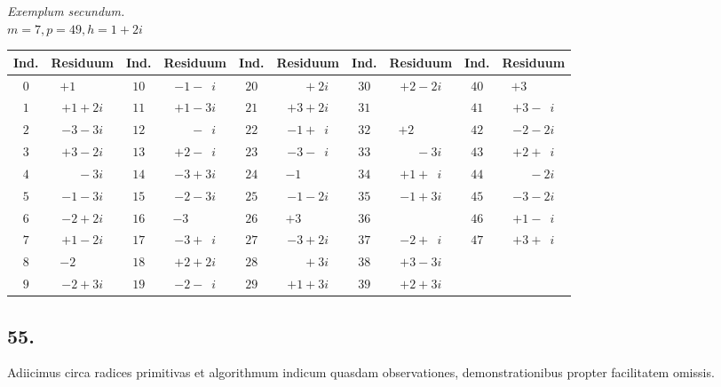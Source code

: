 \documentclass[twoside,12pt]{memoir}
\begin{document}
\begin{center}
\textit{Exemplum secundum.}\\
\(m=7, p=49, h=1+2 i\)\\
\begin{tabular}{c|c||c|c||c|c||c|c||c|c}
Ind. & Residuum & Ind. & Residuum & Ind. & Residuum & Ind. & Residuum & Ind. & Residuum \\
\hline
\(0\) & \(+1\phantom{\;+0i}\) & \(10\) & \(-1-\phantom{1}i\) & \(20\) & \(\phantom{+0}+2 i\) & \(30\) & \(+2-2 i\) & \(40\) & \(+3\phantom{\;+0i} \)\\[-4pt]
\(1\) & \(+1+2 i\) & \(11\) & \(+1-3 i\) & \(21\) & \(+3+2 i\) & \(31\) & \(\) & \(41\) & \(+3-\phantom{1}i \)\\[-4pt]
\(2\) & \(-3-3 i\) & \(12\) & \(\phantom{+0}-\phantom{1}i\) & \(22\) & \(-1+\phantom{1}i\) & \(32\) & \(+2\phantom{\;+0i}\) & \(42\) & \(-2-2 i \)\\[-4pt]
\(3\) & \(+3-2 i\) & \(13\) & \(+2-\phantom{1}i\) & \(23\) & \(-3-\phantom{1}i\) & \(33\) & \(\phantom{+0}-3 i\) & \(43\) & \(+2+\phantom{1}i \)\\[-4pt]
\(4\) & \(\phantom{+0}-3 i\) & \(14\) & \(-3+3 i\) & \(24\) & \(-1\phantom{\;+0i}\) & \(34\) & \(+1+\phantom{1}i\) & \(44\) & \(\phantom{+0}-2 i \)\\[-4pt]
\(5\) & \(-1-3 i\) & \(15\) & \(-2-3 i\) & \(25\) & \(-1-2 i\) & \(35\) & \(-1+3 i\) & \(45\) & \(-3-2 i \)\\[-4pt]
\(6\) & \(-2+2i\) & \(16\) & \(-3\phantom{\;+0i}\) & \(26\) & \(+3\phantom{\;+0i}\) & \(36\) & \(\) & \(46\) & \(+1-\phantom{1}i \)\\[-4pt]
\(7\) & \(+1-2 i\) & \(17\) & \(-3+\phantom{1}i\) & \(27\) & \(-3+2 i\) & \(37\) & \(-2+\phantom{1}i\) & \(47\) & \(+3+\phantom{1}i \)\\[-4pt]
\(8\) & \(-2\phantom{\;+0i}\) & \(18\) & \(+2+2 i\) & \(28\) & \(\phantom{+0}+3 i\) & \(38\) & \(+3-3 i\) & \multicolumn{2}{c}{}\\[-4pt]
\(9\) & \(-2+3 i\) & \(19\) & \(-2-\phantom{1}i\) & \(29\) & \(+1+3 i\) & \(39\) & \(+2+3 i\) & \multicolumn{2}{c}{}
\end{tabular}
\end{center}

\subsection*{55.}
 
Adiicimus circa radices primitivas et algorithmum indicum quasdam observationes, demonstrationibus propter facilitatem omissis.
 
\end{document}
